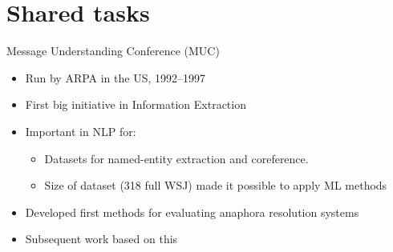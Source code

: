 \documentclass[dvipsnames, 10pt, compress]{beamer}
\begin{document}

\section{Shared tasks}

\begin{frame}{Message Understanding Conference (MUC)}

\begin{itemize}
  \item Run by ARPA in the US, 1992--1997
  \item First big initiative in Information Extraction 
  \item Important in NLP for:
  \begin{itemize}
    \item Datasets for named-entity extraction and coreference.
    \item Size of dataset (318 full WSJ) made it possible to apply ML methods
  \end{itemize}
  \item Developed first methods for evaluating anaphora resolution systems 
  \item Subsequent work based on this
\end{itemize}


\end{frame}
\end{document}
